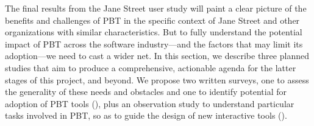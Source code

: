 
\iflater{}\fi

The final results from the Jane Street user study\iflater{}\fi{} will
paint a clear
picture of the benefits and challenges of PBT in the specific context
of Jane Street and other organizations with similar characteristics.  But to
fully understand the potential impact of PBT across the software
industry---and the factors that may limit its adoption---we need to
cast a wider net.
%
In this section, we describe three planned studies that aim
to produce a comprehensive, actionable
agenda for the latter stages of this project, and beyond.  We propose two
written surveys, one to assess the generality of these needs and obstacles
and one to identify potential for adoption of PBT tools
(), plus an observation study to understand
particular tasks involved in PBT, so as to guide the design of new
interactive tools
().

